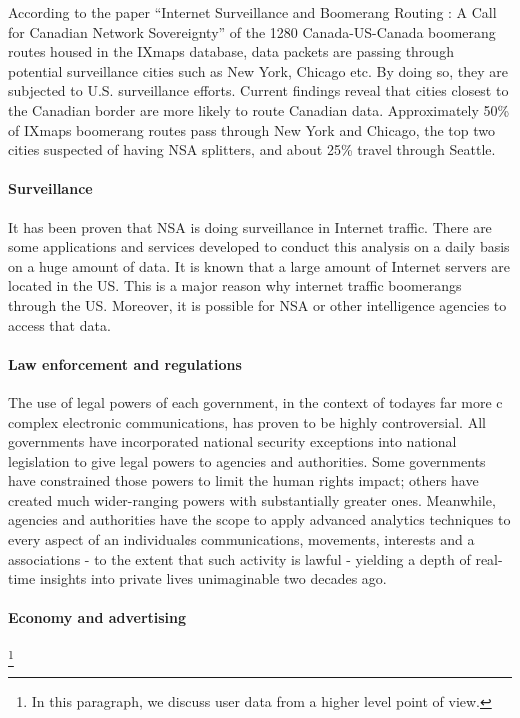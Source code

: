 According to the paper ``Internet Surveillance and Boomerang Routing : A Call 
for Canadian Network Sovereignty'' of the 1280 Canada-US-Canada  boomerang  
routes housed in the IXmaps database, data packets are passing through potential 
surveillance cities such as New York, Chicago etc. By doing so, they are 
subjected  to U.S. surveillance efforts. Current findings reveal that cities 
closest to the Canadian border are more likely to route Canadian data. 
Approximately 50\% of IXmaps boomerang routes pass  through  New  York  and 
Chicago, the top two cities suspected of having NSA splitters, and about 25\% 
travel through Seattle. 

\paragraph{Surveillance}

It has been proven that NSA is doing surveillance in Internet traffic. There are 
some applications and services developed to conduct this analysis on a daily 
basis on a huge amount of data. It is known that a large amount of Internet 
servers are located in the US. This is a major reason why internet traffic 
boomerangs through the US. Moreover, it is possible for NSA or other 
intelligence agencies to access that data.

\paragraph{Law enforcement and regulations}

The use of legal powers of each government, in the context of today¢s far more c
complex electronic communications, has proven to be highly controversial. All 
governments have incorporated national security exceptions into national 
legislation to give legal powers to agencies and authorities. Some governments 
have constrained those powers to limit the human rights impact; others have 
created much wider-ranging powers with substantially greater ones. Meanwhile, 
agencies and authorities have the scope to apply advanced analytics techniques 
to every aspect of an individual¢s communications, movements, interests and a
associations - to the extent that such activity is lawful - yielding a depth of 
real-time insights into private lives unimaginable two decades ago.

\paragraph{Economy and advertising}
\footnote{In this paragraph, we discuss user data from a higher level point of 
view.}

